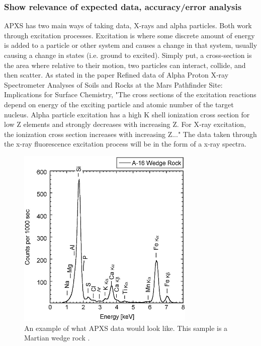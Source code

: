 \documentclass[%
 portrait,
 aapm,
 mph,%
 amsmath,amssymb,
 reprint,%
]{revtex4-2}
\begin{document}
\subsubsection{ Show relevance of expected data, accuracy/error analysis}
APXS has two main ways of taking data, X-rays and alpha particles. Both work through excitation processes. Excitation is where some discrete amount of energy is added to a particle or other system and causes a change in that system, usually causing a change in states (i.e. ground to excited). Simply put, a cross-section is the area where relative to their motion, two particles can interact, collide, and then scatter. As stated in the paper Refined data of Alpha Proton X‐ray Spectrometer Analyses of Soils and Rocks at the Mars Pathfinder Site: Implications for Surface Chemistry, "The cross sections of the excitation reactions depend on energy of the exciting particle and atomic number of the target nucleus. Alpha particle excitation has a high K shell ionization cross section for low Z elements and strongly decreases with increasing Z. For X‐ray excitation, the ionization cross section increases with increasing Z..."
The data taken through the x-ray fluorescence excitation process will be in the form of a x-ray spectra. 
\begin{figure}
  \includegraphics[width=240pt]{Instruments/APXSdata01.png}
   \caption{An example of what APXS data would look like. This sample is a Martian wedge rock \cite{bruckner2003refined}.}
\end{figure} 
\end{document}
